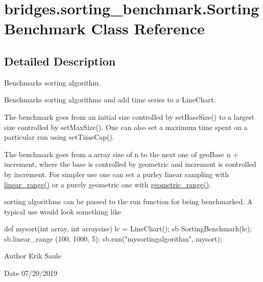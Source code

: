 \hypertarget{classbridges_1_1sorting__benchmark_1_1_sorting_benchmark}{}\section{bridges.\+sorting\+\_\+benchmark.\+Sorting\+Benchmark Class Reference}
\label{classbridges_1_1sorting__benchmark_1_1_sorting_benchmark}


\subsection{Detailed Description}
Benchmarks sorting algorithm. 

Benchmarks sorting algorithms and add time series to a Line\+Chart.

The benchmark goes from an initial size controlled by set\+Base\+Size() to a largest size controlled by set\+Max\+Size(). One can also set a maximum time spent on a particular run using set\+Time\+Cap().

The benchmark goes from a array size of n to the next one of geo\+Base n + increment, where the base is controlled by geometric and increment is controlled by increment. For simpler use one can set a purley linear sampling with \hyperlink{classbridges_1_1sorting__benchmark_1_1_sorting_benchmark_ab5bfca8680018f4c043a78b25dbc1948}{linear\+\_\+range()} or a purely geometric one with \hyperlink{classbridges_1_1sorting__benchmark_1_1_sorting_benchmark_ac9bc45a12b3ebab79d05785c01e4a99e}{geometric\+\_\+range()}.

sorting algorithms can be passed to the run function for being benchmarked. A typical use would look something like


\begin{DoxyCode}
\textcolor{keyword}{def }mysort(int array, int arraysize)
lc = LineChart();
sb SortingBenchmark(lc);
sb.linear\_range (100, 1000, 5);
sb.run(\textcolor{stringliteral}{"mysortingalgorithm"}, mysort);
\end{DoxyCode}


\begin{DoxyAuthor}{Author}
Erik Saule 
\end{DoxyAuthor}
\begin{DoxyDate}{Date}
07/20/2019 
\end{DoxyDate}
